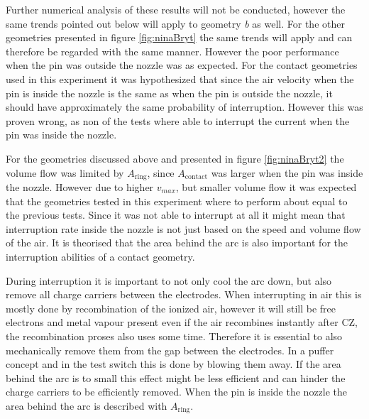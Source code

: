 \documentclass[10pt,a4paper,twoside]{article}
\begin{document}
Further numerical analysis of these results will not be conducted, however the same trends pointed out below will apply to geometry \textit{b} as well. For the other geometries presented in figure \ref{fig:ninaBryt} the same trends will apply and can therefore be regarded with the same manner. However the poor performance when the pin was outside the nozzle was as expected. For the contact geometries used in this experiment it was hypothesized that since the air velocity when the pin is inside the nozzle is the same as when the pin is outside the nozzle, it should have approximately the same probability of interruption. However this was proven wrong, as non of the tests where able to interrupt the current when the pin was inside the nozzle.

For the geometries discussed above and presented in figure \ref{fig:ninaBryt2} the volume flow was limited by $A_\mathrm{{ring}}$, since $A_\mathrm{{contact}}$ was larger when the pin was inside the nozzle. However due to higher $v_{max}$, but smaller volume flow it was expected that the geometries tested in this experiment where to perform about equal to the previous tests. Since it was not able to interrupt at all it might mean that interruption rate inside the nozzle is not just based on the speed and volume flow of the air. It is theorised that the area behind the arc is also important for the interruption abilities of a contact geometry.

During interruption it is important to not only cool the arc down, but also remove all charge carriers between the electrodes. When interrupting in air this is mostly done by recombination of the ionized air, however it will still be free electrons and metal vapour present even if the air recombines instantly after CZ, the recombination proses also uses some time. Therefore it is essential to also mechanically remove them from the gap between the electrodes. In a puffer concept and in the test switch this is done by blowing them away. If the area behind the arc is to small this effect might be less efficient and can hinder the charge carriers to be efficiently removed. When the pin is inside the nozzle the area behind the arc is described with $A_\mathrm{{ring}}$.
\end{document}
